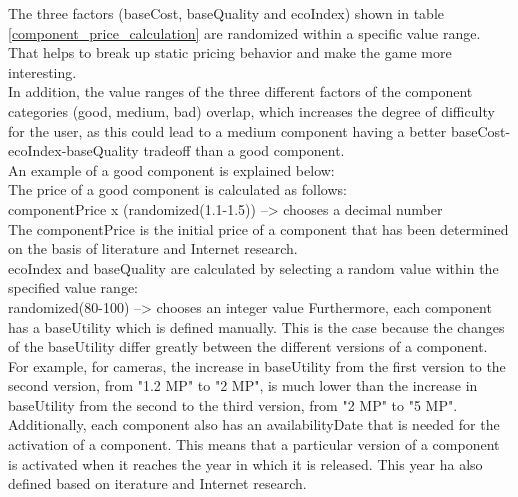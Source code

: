 The three factors (baseCost, baseQuality and ecoIndex) shown in table \ref{component_price_calculation} are randomized within a specific value range. That helps to break up static pricing behavior and make the game more interesting.\\
In addition, the value ranges of the three different factors of the component categories (good, medium, bad) overlap, which increases the degree of difficulty for the user, as this could lead to a medium component having a better baseCost-ecoIndex-baseQuality tradeoff than a good component.\\
An example of a good component is explained below:\\
The price of a good component is calculated as follows:\\
componentPrice x (randomized(1.1-1.5)) --> chooses a decimal number\\
The componentPrice is the initial price of a component that has been determined on the basis of literature and Internet research.\\
ecoIndex and baseQuality are calculated by selecting a random value within the specified value range:\\
randomized(80-100) --> chooses an integer value
\newline
Furthermore, each component has a baseUtility which is defined manually. This is the case because the changes of the baseUtility differ greatly between the different versions of a component. For example, for cameras, the increase in baseUtility from the first version to the second version, from "1.2 MP" to "2 MP", is much lower than the increase in baseUtility from the second to the third version, from "2 MP" to "5 MP".\\

Additionally, each component also has an availabilityDate that is needed for the activation of a component. This means that a particular version of a component is activated when it reaches the year in which it is released. This year ha also defined based on iterature and Internet research.\\

